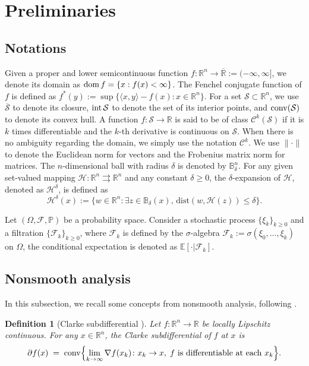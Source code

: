 \documentclass[11pt]{article}
\newcommand{\R}{\mathbb R}
\newcommand{\cC}{\mathcal C}
\newcommand{\cH}{\mathcal H}
\newcommand{\cS}{\mathcal S}
\newtheorem{definition}{Definition}[section]
\def\conv{{\rm conv}}
\def\dom{{\rm dom}}
\begin{document}
\section{Preliminaries}
\subsection{Notations}
Given a proper and lower semicontinuous function $f:\mathbb{R}^n\rightarrow\overline{\mathbb{R}} := (-\infty,\infty]$, we denote its domain as $\dom\,f=\{x:f(x)<\infty\}$. The Fenchel conjugate function of $f$ is defined as $f^*(y):=\sup\{\langle x,y\rangle - f(x):x\in\mathbb{R}^n\}$. For a set $\mathcal{S}\subset\mathbb{R}^n$, we use ${\overline{\mathcal{S}}}$ to denote its closure, ${\rm int}\,\mathcal{S}$ to denote the set of its interior points, and ${\rm conv}(\cS)$ to denote its convex hull. A function $f:\cS\rightarrow\R$ is said to be of class ${\cC}^k(\mathcal{S})$ if it is $k$ times differentiable and the $k$-th derivative is continuous on $\mathcal{S}$. When there is no ambiguity regarding the domain, we simply use the notation ${\cC}^k$. We use $\|\cdot\|$ to denote the Euclidean norm for vectors and the Frobenius matrix norm for matrices. The $n$-dimensional ball with radius $\delta$ is denoted by $\mathbb{B}^n_\delta$. For any given set-valued mapping $\cH: \R^n \rightrightarrows \R^n$ and any constant $\delta \geq 0$,  the $\delta$-expansion of $\cH$, denoted as $\cH^{\delta}$,  is defined as
\begin{equation*}
    \cH^{\delta}(x) := \{ w \in \R^n: \exists z \in \mathbb{B}_{\delta}(x), \, \mathrm{dist}(w, {\cH}(z))\leq \delta \}.
\end{equation*}

Let $(\Omega,\mathcal{F},\mathbb{P})$ be a probability space. Consider a stochastic process $\{\xi_k\}_{k\geq0}$ and a filtration $\{\mathcal{F}_k\}_{k\geq0}$, where $\mathcal{F}_k$ is defined by the $\sigma$-algebra $\mathcal{F}_k:=\sigma(\xi_0,\ldots,\xi_k)$ on $\Omega$, the conditional expectation is denoted as $\mathbb{E}[\cdot|\mathcal{F}_k]$.  


\subsection{Nonsmooth analysis}

In this subsection, we recall some concepts from nonsmooth analysis, following \cite{clarke1990optimization,davis2020stochastic,bolte2021conservative}.

\begin{definition}[Clarke subdifferential {\cite{clarke1990optimization}}]
\label{Defin_Subdifferential}
Let \(f\colon\R^n\to\R\) be locally Lipschitz continuous. For any \(x\in\R^n\), the \emph{Clarke subdifferential} of \(f\) at \(x\) is
\[
\partial f(x)
\;=\;
\conv\Bigl\{\lim_{k\to\infty}\nabla f(x_k)\colon x_k\to x,\;f\text{ is differentiable at each }x_k\Bigr\}.
\]
\end{definition}
\end{document}
